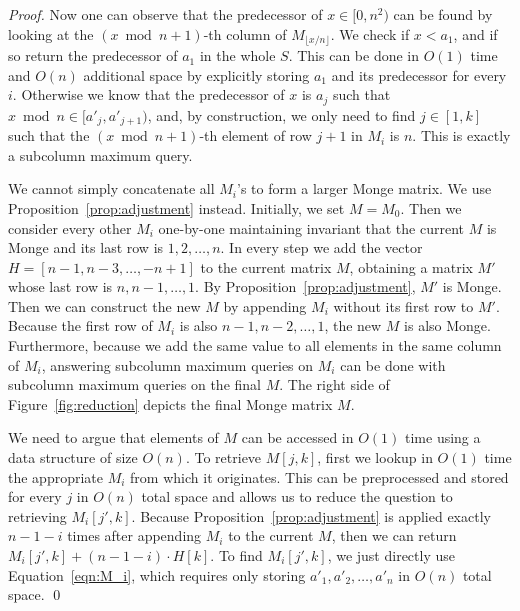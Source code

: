 \documentclass{llncs}
\begin{document}
\begin{proof}
Now one can observe that the predecessor of $x\in [0,n^{2})$ can be found by looking at the $(x\bmod n+1)$-th column
of $M_{\lfloor x/n\rfloor }$. We check if $x < a_{1}$, and if so return the predecessor of $a_{1}$ in the whole $S$.
This can be done in $O(1)$ time and $O(n)$ additional space by explicitly storing $a_{1}$ and its predecessor for every $i$.
Otherwise we know that the predecessor of $x$ is $a_{j}$ such that $x\bmod n \in [a'_{j},a'_{j+1})$, and, 
by construction, we only need to find $j\in [1,k]$ such that the $(x\bmod n+1)$-th element of row $j+1$ in $M_{i}$ is $n$.
This is exactly a subcolumn maximum query.

We cannot simply concatenate all $M_{i}$'s to form a larger Monge matrix. We use Proposition~\ref{prop:adjustment}
instead. Initially, we set $M=M_{0}$. Then we consider every other $M_{i}$ one-by-one maintaining invariant
that the current $M$ is Monge and its last row is $1,2,\ldots,n$. In every step we add the vector 
$H=[n-1,n-3,\ldots,-n+1]$ to the current matrix $M$, obtaining a matrix $M'$ whose last row is $n,n-1,\ldots,1$. By Proposition~\ref{prop:adjustment}, $M'$ is Monge. 
Then we can construct the new $M$ by appending $M_{i}$ without its first row to $M'$.
Because the first row of $M_{i}$ is also $n-1,n-2,\ldots,1$, the new $M$ is also Monge. Furthermore, because we add the
same value to all elements in the same column of $M_{i}$, answering subcolumn maximum queries on $M_{i}$ can
be done with subcolumn maximum queries on the final $M$.  The right side of Figure~\ref{fig:reduction} depicts
the final Monge matrix $M$.

We need to argue that elements of $M$ can be accessed in $O(1)$ time using a data structure of size $O(n)$. To
retrieve $M[j,k]$, first we lookup in $O(1)$ time the appropriate $M_{i}$ from which it originates. This
can be preprocessed and stored for every $j$ in $O(n)$ total space and allows us to reduce the question to retrieving
$M_{i}[j',k]$. Because Proposition~\ref{prop:adjustment} is applied exactly $n-1-i$ times after appending $M_{i}$
to the current $M$, then we can return $M_{i}[j',k]+(n-1-i)\cdot H[k]$. To find $M_{i}[j',k]$, we just directly use Equation~\ref{eqn:M_i},
which requires only storing $a'_{1},a'_{2},\ldots,a'_{n}$ in $O(n)$ total space.
\qed \end{proof}
\end{document}
